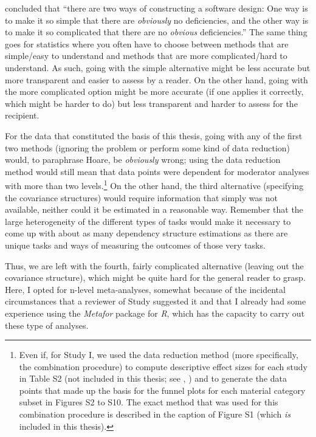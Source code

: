 \textcite[p. 81]{Hoare1980} concluded that ``there are two ways of constructing a software design: One way is to make it so simple that there are \emph{obviously} no deficiencies, and the other way is to make it so complicated that there are no \emph{obvious} deficiencies.'' The same thing goes for statistics where you often have to choose between methods that are simple/easy to understand and methods that are more complicated/hard to understand. As such, going with the simple alternative might be less accurate but more transparent and easier to assess by a reader. On the other hand, going with the more complicated option might be more accurate (if one applies it correctly, which might be harder to do) but less transparent and harder to assess for the recipient.

For the data that constituted the basis of this thesis, going with any of the first two methods (ignoring the problem or perform some kind of data reduction) would, to paraphrase Hoare, be \emph{obviously} wrong; using the data reduction method would still mean that data points were dependent for moderator analyses with more than two levels.\footnote{Even if, for Study I, we used the data reduction method (more specifically, the combination procedure) to compute descriptive effect sizes for each study in Table S2 (not included in this thesis; see \citeauthor{Asperholm2019}, \citeyear{Asperholm2019}) and to generate the data points that made up the basis for the funnel plots for each material category subset in Figures S2 to S10. The exact method that was used for this combination procedure is described in the caption of Figure S1 (which \emph{is} included in this thesis).} On the other hand, the third alternative (specifying the covariance structures) would require information that simply was not available, neither could it be estimated in a reasonable way. Remember that the large heterogeneity of the different types of tasks would make it necessary to come up with about as many dependency structure estimations as there are unique tasks and ways of measuring the outcomes of those very tasks.

Thus, we are left with the fourth, fairly complicated alternative (leaving out the covariance structure), which might be quite hard for the general reader to grasp. Here, I opted for n-level meta-analyses, somewhat because of the incidental circumstances that a reviewer of Study  suggested it and that I already had some experience using the \emph{Metafor} package \parencite{Viechtbauer2010} for \emph{R}, which has the capacity to carry out these type of analyses.


